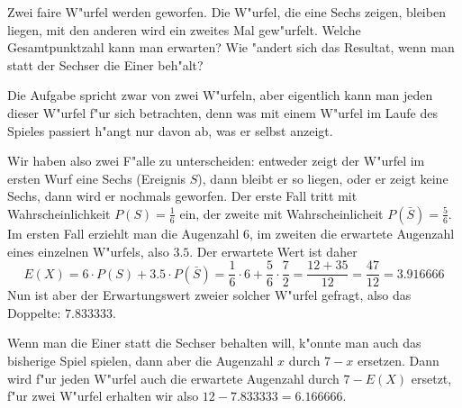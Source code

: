 Zwei faire W"urfel werden geworfen. Die W"urfel, die eine Sechs
zeigen, bleiben liegen, mit den anderen wird ein zweites Mal gew"urfelt.
Welche Gesamtpunktzahl kann man erwarten?
Wie "andert sich das Resultat, wenn man statt der Sechser die Einer
beh"alt?

\begin{loesung}
Die Aufgabe spricht zwar von zwei W"urfeln, aber eigentlich kann man
jeden dieser W"urfel f"ur sich betrachten, denn was mit einem W"urfel
im Laufe des Spieles passiert h"angt nur davon ab, was er selbst
anzeigt.

Wir haben also zwei F"alle zu unterscheiden: entweder zeigt der
W"urfel im ersten Wurf eine Sechs (Ereignis $S$), dann bleibt er so liegen,
oder er zeigt keine Sechs, dann wird er nochmals geworfen.
Der erste Fall tritt mit Wahrscheinlichkeit $P(S)=\frac16$ ein,
der zweite mit Wahrscheinlicheit $P(\bar{S})=\frac56$. Im ersten Fall
erziehlt man die Augenzahl $6$, im zweiten die erwartete
Augenzahl eines einzelnen W"urfels, also $3.5$. Der erwartete
Wert ist daher
\[
E(X)=6\cdot P(S) + 3.5 \cdot P(\bar S)=
\frac16\cdot 6 +\frac56\cdot\frac72=\frac{12+35}{12}=\frac{47}{12}=3.916666
\]
Nun ist aber der Erwartungswert zweier solcher W"urfel
gefragt, also das Doppelte: $7.833333$.

Wenn man die Einer statt die Sechser behalten will, k"onnte man
auch das bisherige Spiel spielen, dann aber die Augenzahl
$x$ durch $7-x$ ersetzen. Dann wird f"ur jeden W"urfel auch
die erwartete Augenzahl durch $7-E(X)$ ersetzt, f"ur zwei
W"urfel erhalten wir also $12-7.833333 = 6.166666$.


\end{loesung}
